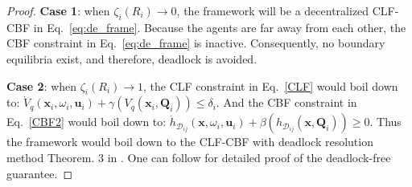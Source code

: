 \documentclass[letterpaper, 10 pt, conference]{ieeeconf}
\theoremstyle{plain}
\begin{document}
\begin{proof}
\textbf{Case 1}: when $\zeta_i(R_i) \to 0$, the framework will be a decentralized CLF-CBF in Eq.~\eqref{eq:de_frame}. Because the agents are far away from each other, the CBF constraint in Eq.~\eqref{eq:de_frame} is inactive. 
Consequently, no boundary equilibria exist, and therefore, deadlock is avoided.





\textbf{Case 2}: when $\zeta_i(R_i) \to 1$, the CLF constraint in Eq.~\eqref{CLF} would boil down to:
$\dot{V}_q(\mathbf{x}_i, \omega_i, \mathbf{u}_i) + \gamma (V_q(\mathbf{x}_i, \mathbf{Q}_i)) \le \delta_i$.
And the CBF constraint in Eq.~\eqref{CBF2} would boil down to:
$\dot{h}_{\mathcal{D}_{ij}}(\mathbf{x}, \omega_i, \mathbf{u}_i) + \beta (h_{\mathcal {D}_{ij}}(\mathbf{x}, \mathbf{Q}_i)) \ge 0$.
Thus the framework would boil down to the CLF-CBF with deadlock resolution method Theorem. 3 in \cite{reis2020control}. One can follow \cite{reis2020control} for detailed proof of the deadlock-free guarantee.



\end{proof}
\end{document}
